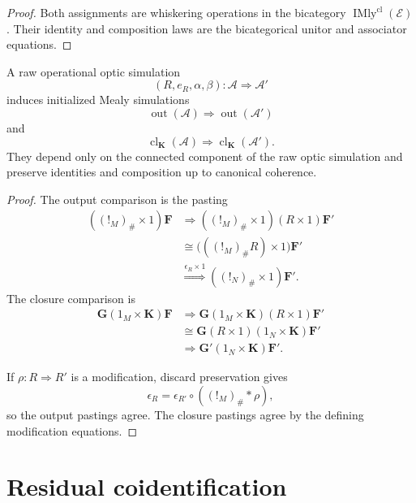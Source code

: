 \begin{proof}
Both assignments are whiskering operations in the bicategory
\(\operatorname{IMly}^{\mathrm{cl}}(\mathcal E)\). Their identity and composition laws are the
bicategorical unitor and associator equations.
\end{proof}

\begin{proposition}
\label{prop:output-closure-comparisons}
A raw operational optic simulation
\[
  (R,e_R,\alpha,\beta):
  \mathcal A\Longrightarrow\mathcal A'
\]
induces initialized Mealy simulations
\[
  \operatorname{out}(\mathcal A)
  \Longrightarrow
  \operatorname{out}(\mathcal A')
\]
and
\[
  \operatorname{cl}_{\mathbf K}(\mathcal A)
  \Longrightarrow
  \operatorname{cl}_{\mathbf K}(\mathcal A').
\]
They depend only on the connected component of the raw optic simulation and preserve identities and
composition up to canonical coherence.
\end{proposition}

\begin{proof}
The output comparison is the pasting
\[
\begin{aligned}
  ((!_M)_\#\times1)\mathbf F
  &\Longrightarrow
  ((!_M)_\#\times1)(R\times1)\mathbf F'
  \\
  &\cong
  \bigl(
    ((!_M)_\#R)\times1
  \bigr)\mathbf F'
  \\
  &\overset{\epsilon_R\times1}{\Longrightarrow}
  ((!_N)_\#\times1)\mathbf F'.
\end{aligned}
\]
The closure comparison is
\[
\begin{aligned}
  \mathbf G(1_M\times\mathbf K)\mathbf F
  &\Longrightarrow
  \mathbf G(1_M\times\mathbf K)(R\times1)\mathbf F'
  \\
  &\cong
  \mathbf G(R\times1)(1_N\times\mathbf K)\mathbf F'
  \\
  &\Longrightarrow
  \mathbf G'(1_N\times\mathbf K)\mathbf F'.
\end{aligned}
\]

If \(\rho:R\Longrightarrow R'\) is a modification, discard preservation gives
\[
  \epsilon_R
  =
  \epsilon_{R'}
  \circ
  ((!_M)_\#\ast\rho),
\]
so the output pastings agree. The closure pastings agree by the defining modification equations.
\end{proof}

\section{Residual coidentification}
\label{sec:residual-coidentification}

